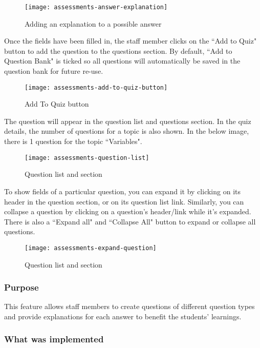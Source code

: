\begin{figure}[h!]
	\centering
	\texttt{[image: assessments-answer-explanation]}
	\caption{Adding an explanation to a possible answer}
\end{figure}

Once the fields have been filled in, the staff member clicks on the ``Add to Quiz" button to add the question to the questions section. By default, ``Add to Question Bank" is ticked so all questions will automatically be saved in the question bank for future re-use.

\begin{figure}[h!]
	\centering
	\texttt{[image: assessments-add-to-quiz-button]}
	\caption{Add To Quiz button}
\end{figure}

The question will appear in the question list and questions section. In the quiz details, the number of questions for a topic is also shown. In the below image, there is 1 question for the topic ``Variables".

\begin{figure}[!hbpt]
	\centering
	\texttt{[image: assessments-question-list]}
	\caption{Question list and section}
\end{figure}

To show fields of a particular question, you can expand it by clicking on its header in the question section, or on its question list link. Similarly, you can collapse a question by clicking on a question's header/link while it's expanded. There is also a ``Expand all" and ``Collapse All" button to expand or collapse all questions.

\begin{figure}[h!]
	\centering
	\texttt{[image: assessments-expand-question]}
	\caption{Question list and section}
\end{figure}

\subsubsection{Purpose}
This feature allows staff members to create questions of different question types and provide explanations for each answer to benefit the students' learnings. 

\subsubsection{What was implemented}

